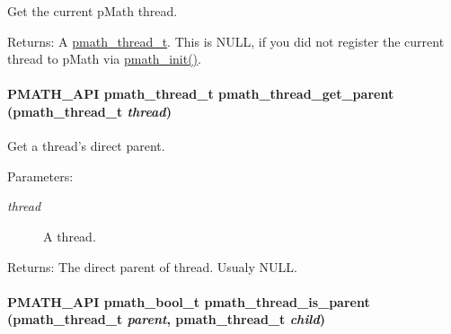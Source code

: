 Get the current pMath thread. 

\begin{Desc}
\item[Returns:]A \hyperlink{classpmath__thread__t}{pmath\_\-thread\_\-t}. This is NULL, if you did not register the current thread to pMath via \hyperlink{group__frontend_gfb9f2c789bee5295c6794d16c0164943}{pmath\_\-init()}. \end{Desc}
\hypertarget{group__threads_gb0e137fb921f9b329a8a9e7c4efa3b3d}{
\paragraph[{pmath\_\-thread\_\-get\_\-parent}]{\setlength{\rightskip}{0pt plus 5cm}PMATH\_\-API {\bf pmath\_\-thread\_\-t} pmath\_\-thread\_\-get\_\-parent ({\bf pmath\_\-thread\_\-t} {\em thread})}\hfill}
\label{group__threads_gb0e137fb921f9b329a8a9e7c4efa3b3d}


Get a thread's direct parent. 

\begin{Desc}
\item[Parameters:]
\begin{description}
\item[{\em thread}]A thread. \end{description}
\end{Desc}
\begin{Desc}
\item[Returns:]The direct parent of thread. Usualy NULL. \end{Desc}
\hypertarget{group__threads_g4409c7f042a1809eee72329002635fb9}{
\paragraph[{pmath\_\-thread\_\-is\_\-parent}]{\setlength{\rightskip}{0pt plus 5cm}PMATH\_\-API {\bf pmath\_\-bool\_\-t} pmath\_\-thread\_\-is\_\-parent ({\bf pmath\_\-thread\_\-t} {\em parent}, \/  {\bf pmath\_\-thread\_\-t} {\em child})}\hfill}
\label{group__threads_g4409c7f042a1809eee72329002635fb9}


